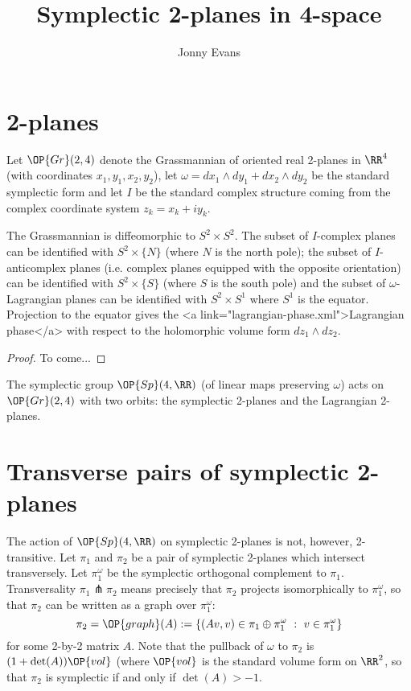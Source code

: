 
\title{Symplectic 2-planes in 4-space}
\author{Jonny Evans}




\section{2-planes}

Let $\OP{Gr}(2,4)$ denote the Grassmannian of oriented real 2-planes in $\RR^4$ (with coordinates $x_1,y_1,x_2,y_2$), let $\omega=dx_1\wedge dy_1+dx_2\wedge dy_2$ be the standard symplectic form and let $I$ be the standard complex structure coming from the complex coordinate system $z_k=x_k+iy_k$.

\begin{Lemma}
  The Grassmannian is diffeomorphic to $S^2\times S^2$. The subset of $I$-complex planes can be identified with $S^2\times\{N\}$ (where $N$ is the north pole); the subset of $I$-anticomplex planes (i.e. complex planes equipped with the opposite orientation) can be identified with $S^2\times\{S\}$ (where $S$ is the south pole) and the subset of $\omega$-Lagrangian planes can be identified with $S^2\times S^1$ where $S^1$ is the equator. Projection to the equator gives the <a link="lagrangian-phase.xml">Lagrangian phase</a> with respect to the holomorphic volume form $dz_1\wedge dz_2$.
\end{Lemma}
\begin{proof}
  To come...
\end{proof}

The symplectic group $\OP{Sp}(4,\RR)$ (of linear maps preserving $\omega$) acts on $\OP{Gr}(2,4)$ with two orbits: the symplectic 2-planes and the Lagrangian 2-planes.

\section{Transverse pairs of symplectic 2-planes}

The action of $\OP{Sp}(4,\RR)$ on symplectic 2-planes is not, however, 2-transitive. Let $\pi_1$ and $\pi_2$ be a pair of symplectic 2-planes which intersect transversely. Let $\pi_1^{\omega}$ be the symplectic orthogonal complement to $\pi_1$. Transversality $\pi_1\pitchfork\pi_2$ means precisely that $\pi_2$ projects isomorphically to $\pi_1^{\omega}$, so that $\pi_2$ can be written as a graph over $\pi_1^{\omega}$:
\[\pi_2=\OP{graph}(A):=\{(Av,v)\in\pi_1\oplus\pi_1^{\omega}\ :\ v\in\pi_1^{\omega}\}\]
for some 2-by-2 matrix $A$. Note that the pullback of $\omega$ to $\pi_2$ is $(1+\det(A))\OP{vol}$ (where $\OP{vol}$ is the standard volume form on $\RR^2$, so that $\pi_2$ is symplectic if and only if $\det(A)>-1$.

